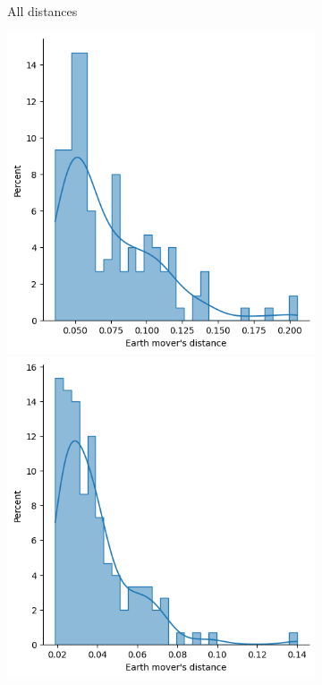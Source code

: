 \begin{figure}[htb]
\begin{subfigure}[t]{\textwidth+20pt\relax}
            \caption{All distances}\label{fig:emdsairplane1}
          \end{subfigure}\hfill
          \begin{subfigure}[t]{0.36\textwidth}
            \includegraphics[width=\textwidth]{figures/dropcon/matched_mean_emds.png}
            \includegraphics[width=\textwidth]{figures/dropout/matched_mean_emds.png}

\end{subfigure}
\end{figure}
